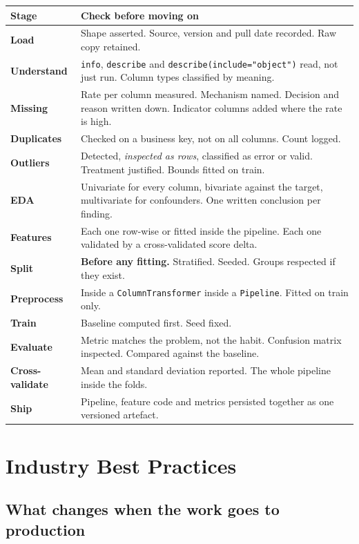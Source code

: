 \documentclass[11pt,a4paper]{article}
\begin{document}
\begin{tabularx}{\textwidth}{@{}>{\bfseries}l X@{}}
\toprule
\rowcolor{tablehead} \textrm{\bfseries Stage} & \textbf{Check before moving on} \\
\midrule
Load & Shape asserted. Source, version and pull date recorded. Raw copy retained. \\
Understand & \lstinline|info|, \lstinline|describe| and \lstinline|describe(include="object")| read, not just run. Column types classified by meaning. \\
Missing & Rate per column measured. Mechanism named. Decision and reason written down. Indicator columns added where the rate is high. \\
Duplicates & Checked on a business key, not on all columns. Count logged. \\
Outliers & Detected, \emph{inspected as rows}, classified as error or valid. Treatment justified. Bounds fitted on train. \\
EDA & Univariate for every column, bivariate against the target, multivariate for confounders. One written conclusion per finding. \\
Features & Each one row-wise or fitted inside the pipeline. Each one validated by a cross-validated score delta. \\
Split & \textbf{Before any fitting.} Stratified. Seeded. Groups respected if they exist. \\
Preprocess & Inside a \lstinline|ColumnTransformer| inside a \lstinline|Pipeline|. Fitted on train only. \\
Train & Baseline computed first. Seed fixed. \\
Evaluate & Metric matches the problem, not the habit. Confusion matrix inspected. Compared against the baseline. \\
Cross-validate & Mean and standard deviation reported. The whole pipeline inside the folds. \\
Ship & Pipeline, feature code and metrics persisted together as one versioned artefact. \\
\bottomrule
\end{tabularx}

\newpage
\section{Industry Best Practices}

\subsection{What changes when the work goes to production}
\end{document}

